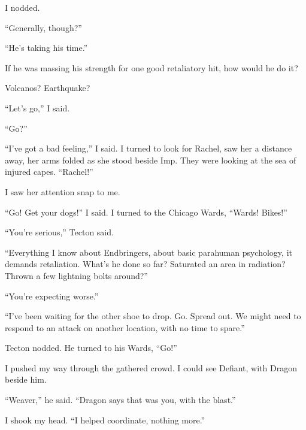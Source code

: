 I nodded.



``Generally, though?''



``He's taking his time.''



If he was massing his strength for one good retaliatory hit, how would he do it?



Volcanos?  Earthquake?



``Let's go,'' I said.



``Go?''



``I've got a bad feeling,'' I said.  I turned to look for Rachel, saw her a distance away, her arms folded as she stood beside Imp.  They were looking at the sea of injured capes.  ``Rachel!''



I saw her attention snap to me.



``Go!  Get your dogs!''  I said.  I turned to the Chicago Wards, ``Wards!  Bikes!''



``You're serious,'' Tecton said.



``Everything I know about Endbringers, about basic parahuman psychology, it demands retaliation.  What's he done so far?  Saturated an area in radiation?  Thrown a few lightning bolts around?''



``You're expecting worse.''



``I've been waiting for the other shoe to drop.  Go.  Spread out.  We might need to respond to an attack on another location, with no time to spare.''



Tecton nodded.  He turned to his Wards, ``Go!''



I pushed my way through the gathered crowd.  I could see Defiant, with Dragon beside him.



``Weaver,'' he said.  ``Dragon says that was you, with the blast.''



I shook my head.  ``I helped coordinate, nothing more.''




